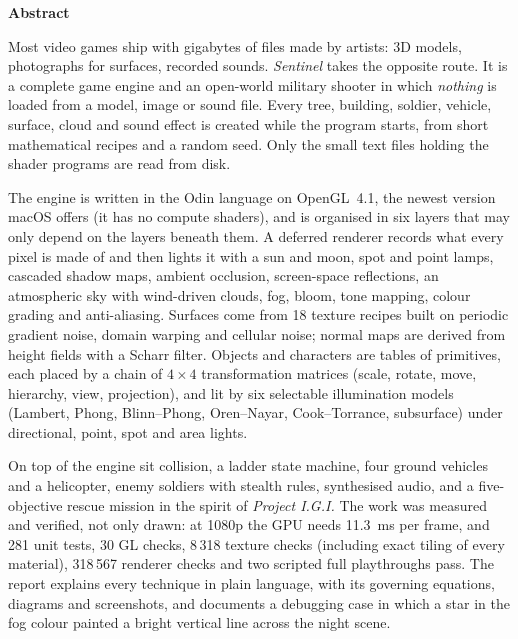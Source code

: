 \documentclass[12pt,a4paper,oneside]{report}
\newcommand{\fmheading}[1]{\begin{center}{\fontsize{16}{24}\bfseries\selectfont #1}\end{center}\vspace{18pt}}
\begin{document}
\clearpage
{}
\setcounter{page}{1}
{}
\fmheading{Abstract}

Most video games ship with gigabytes of files made by artists: 3D models, photographs for surfaces, recorded sounds. \textit{Sentinel} takes the opposite route. It is a complete game engine and an open-world military shooter in which \emph{nothing} is loaded from a model, image or sound file. Every tree, building, soldier, vehicle, surface, cloud and sound effect is created while the program starts, from short mathematical recipes and a random seed. Only the small text files holding the shader programs are read from disk.

The engine is written in the Odin language on OpenGL~4.1, the newest version macOS offers (it has no compute shaders), and is organised in six layers that may only depend on the layers beneath them. A deferred renderer records what every pixel is made of and then lights it with a sun and moon, spot and point lamps, cascaded shadow maps, ambient occlusion, screen-space reflections, an atmospheric sky with wind-driven clouds, fog, bloom, tone mapping, colour grading and anti-aliasing. Surfaces come from 18 texture recipes built on periodic gradient noise, domain warping and cellular noise; normal maps are derived from height fields with a Scharr filter. Objects and characters are tables of primitives, each placed by a chain of $4\times4$ transformation matrices (scale, rotate, move, hierarchy, view, projection), and lit by six selectable illumination models (Lambert, Phong, Blinn--Phong, Oren--Nayar, Cook--Torrance, subsurface) under directional, point, spot and area lights.

On top of the engine sit collision, a ladder state machine, four ground vehicles and a helicopter, enemy soldiers with stealth rules, synthesised audio, and a five-objective rescue mission in the spirit of \textit{Project I.G.I.} The work was measured and verified, not only drawn: at 1080p the GPU needs 11.3~ms per frame, and 281 unit tests, 30 GL checks, 8\,318 texture checks (including exact tiling of every material), 318\,567 renderer checks and two scripted full playthroughs pass. The report explains every technique in plain language, with its governing equations, diagrams and screenshots, and documents a debugging case in which a star in the fog colour painted a bright vertical line across the night scene.
\end{document}
